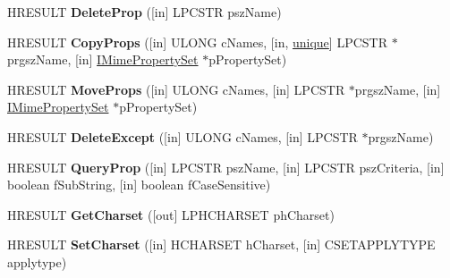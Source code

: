 \begin{DoxyCompactItemize}
H\+R\+E\+S\+U\+LT {\bfseries Delete\+Prop} (\mbox{[}in\mbox{]} L\+P\+C\+S\+TR psz\+Name)
\item 
\mbox{\label{interface_m_i_m_e_o_l_e_1_1_i_mime_property_set_a2ea508873a9b0560d0eb0823137dc48e}} 
H\+R\+E\+S\+U\+LT {\bfseries Copy\+Props} (\mbox{[}in\mbox{]} U\+L\+O\+NG c\+Names, \mbox{[}in, \hyperlink{interfaceunique}{unique}\mbox{]} L\+P\+C\+S\+TR $\ast$prgsz\+Name, \mbox{[}in\mbox{]} \hyperlink{interface_m_i_m_e_o_l_e_1_1_i_mime_property_set}{I\+Mime\+Property\+Set} $\ast$p\+Property\+Set)
\item 
\mbox{\label{interface_m_i_m_e_o_l_e_1_1_i_mime_property_set_a2eddec2b7ad146871a1f87fe0d7e5337}} 
H\+R\+E\+S\+U\+LT {\bfseries Move\+Props} (\mbox{[}in\mbox{]} U\+L\+O\+NG c\+Names, \mbox{[}in\mbox{]} L\+P\+C\+S\+TR $\ast$prgsz\+Name, \mbox{[}in\mbox{]} \hyperlink{interface_m_i_m_e_o_l_e_1_1_i_mime_property_set}{I\+Mime\+Property\+Set} $\ast$p\+Property\+Set)
\item 
\mbox{\label{interface_m_i_m_e_o_l_e_1_1_i_mime_property_set_a60a68f6ee8c042acd0ed8815dfe11ca1}} 
H\+R\+E\+S\+U\+LT {\bfseries Delete\+Except} (\mbox{[}in\mbox{]} U\+L\+O\+NG c\+Names, \mbox{[}in\mbox{]} L\+P\+C\+S\+TR $\ast$prgsz\+Name)
\item 
\mbox{\label{interface_m_i_m_e_o_l_e_1_1_i_mime_property_set_a18b25dbef5f74dad8e496f2000dc0c6c}} 
H\+R\+E\+S\+U\+LT {\bfseries Query\+Prop} (\mbox{[}in\mbox{]} L\+P\+C\+S\+TR psz\+Name, \mbox{[}in\mbox{]} L\+P\+C\+S\+TR psz\+Criteria, \mbox{[}in\mbox{]} boolean f\+Sub\+String, \mbox{[}in\mbox{]} boolean f\+Case\+Sensitive)
\item 
\mbox{\label{interface_m_i_m_e_o_l_e_1_1_i_mime_property_set_a574ebc7320ea613405357dd08d5433bd}} 
H\+R\+E\+S\+U\+LT {\bfseries Get\+Charset} (\mbox{[}out\mbox{]} L\+P\+H\+C\+H\+A\+R\+S\+ET ph\+Charset)
\item 
\mbox{\label{interface_m_i_m_e_o_l_e_1_1_i_mime_property_set_a002952125b47c0520f5fd34fd7aa282b}} 
H\+R\+E\+S\+U\+LT {\bfseries Set\+Charset} (\mbox{[}in\mbox{]} H\+C\+H\+A\+R\+S\+ET h\+Charset, \mbox{[}in\mbox{]} C\+S\+E\+T\+A\+P\+P\+L\+Y\+T\+Y\+PE applytype)

\end{DoxyCompactItemize}
